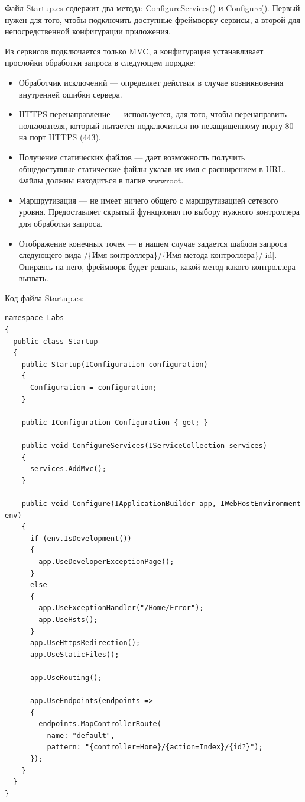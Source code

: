 \documentclass[a4paper,14pt]{extreport}
\begin{document}
Файл Startup.cs содержит два метода: ConfigureServices() и Configure(). Первый нужен для того, чтобы подключить доступные фреймворку сервисы, а второй для непосредственной конфигурации приложения.

Из сервисов подключается только MVC, а конфигурация устанавливает прослойки обработки запроса в следующем порядке:

\begin{itemize}
	\item Обработчик исключений --- определяет действия в случае возникновения внутренней ошибки сервера.
	\item HTTPS-перенаправление --- используется, для того, чтобы перенаправить пользователя, который пытается подключиться по незащищенному порту 80 на порт HTTPS (443).
	\item Получение статических файлов --- дает возможность получить общедоступные статические файлы указав их имя с расширением в URL. Файлы должны находиться в папке wwwroot.
	\item Маршрутизация --- не имеет ничего общего с маршрутизацией сетевого уровня. Предоставляет скрытый функционал по выбору нужного контроллера для обработки запроса.
	\item Отображение конечных точек --- в нашем случае задается шаблон запроса следующего вида /\{Имя контроллера\}/\{Имя метода контроллера\}/[id]. Опираясь на него, фреймворк будет решать, какой метод какого контроллера вызвать.
\end{itemize}

Код файла Startup.cs:
\lstset{language=c++}
\begin{lstlisting}[basicstyle=\small]
namespace Labs
{
  public class Startup
  {
	public Startup(IConfiguration configuration)
	{
	  Configuration = configuration;
	}
		
	public IConfiguration Configuration { get; }
		
	public void ConfigureServices(IServiceCollection services)
	{
	  services.AddMvc();
	}
		
	public void Configure(IApplicationBuilder app, IWebHostEnvironment env)
	{
	  if (env.IsDevelopment())
	  {
		app.UseDeveloperExceptionPage();
	  }
	  else
	  {
		app.UseExceptionHandler("/Home/Error");
		app.UseHsts();
	  }
	  app.UseHttpsRedirection();
	  app.UseStaticFiles();
			
	  app.UseRouting();
			
	  app.UseEndpoints(endpoints =>
	  {
		endpoints.MapControllerRoute(
		  name: "default",
		  pattern: "{controller=Home}/{action=Index}/{id?}");
	  });
	}
  }
}
\end{lstlisting}
\end{document}
